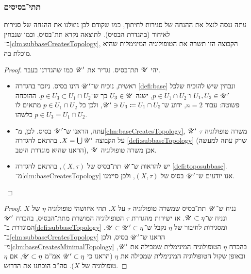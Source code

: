 \documentclass[name=רשימות טופולוגיה כללית]{../../../tex/classes/noChapterMegasumPreamble}
\begin{document}
	\subsubsection{\label{sss:subbases}תתי־בסיסים}

	עתה ננסה לנצל את ההנחה של סגירות לחיתוך, כמו שקודם לכן ניצלנו את ההנחה של סגירות לאיחוד (בהגדרת הבסיס). לתוצאה נקרא תת־בסיס, וכמו שנבחין ב־\ref{clm:subbaseCreatesTopology}, הקבוצה הזו תשרה את הטופולוגיה המינימלית שהיא מוכלת בה. 
	\begin{proof}
		יהי $\mathscr{U}$ תת־בסיס. נגדיר את $\mathscr{U}'$ כמו שהגדרנו בעבר. 
		\begin{itemize}
			\item ראשית, נוכיח ש־$\mathscr{U}'$ הינו בסיס. ניזכר בהגדרה \ref{defi:base} ונבחין שיש להוכיח שלכל $U_1, U_2 \in \mathscr{U}'$ ו־$p \in U_1 \cap U_2$, ישנה $U_3 \in \mathscr{U}$ כך ש־$p \in U_3 \subset U_1 \cap U_2$. ההוכחה פשוטה: עבור $n = 2$, ידוע ש־$\mathscr{U}' \ni U_3 \coloneqq U_1 \cap U_2$, ולכן כל $p \in U_1 \cap U_2$ מתאים לו $p \in U_3 = U_1 \cap U_2$ כלשהו. 
			\item עתה, הראנו ש־$\mathscr{U}'$ בסיס. לכן, מ־\ref{clm:baseCreatesTopology}, $\mathscr{U}'$ משרה טופולוגיה $\tau$ על הקבוצה $X = \bigcup \mathscr{U}'$. בהתאם להגדרה \ref{defi:subbaseTopology} (שרק עתה למעשה הראנו שהיא מוגדרת היטב), $\mathscr{U}$ אכן משרה טופולוגיה. 
			\item יש להראות ש־$\mathscr{U}$ תת־בסיס של $(X, \tau)$, בהתאם להגדרה \ref{defi:toposubbase}. מ־\ref{clm:baseCreatesTopology} אנו יודעים ש־$\mathscr{U}'$ בסיס של $(X, \tau)$, ולכן סיימנו. 
		\end{itemize}\envendproof
	\end{proof}
	\begin{proof}
		נניח ש־$\mathscr{U}$ תת־בסיס שמשרה טופולוגיה $\tau$ על $X$. תהי איזושהי טופולוגיה $\eta$ של $X$ ונניח ש־$\mathscr{U} \subset \eta$. אז ישירות מהגדרת $\tau$ הטופולוגיה המושרת מתת־הבסיס, בהכרח $\mathscr{U}'$ המוגדרת ב־\ref{defi:subbaseTopology} ומסגירות לחיבור של $\eta$ נקבל ש־$\mathscr{U} \subset \mathscr{U}' \subset \eta$. ב־\ref{clm:subbaseCreatesTopology} הראנו ש־$\mathscr{U}'$ בסיס, ולכן מ־\ref{clm:baseCreatesMinimalTopology} בהכרח $\eta$ הטופולוגיה המינימלית שמכילה את $\mathscr{U}'$, ובאופן שקול הטופולוגיה המינימלית שמכילה את $\eta$ (הראנו כי $\mathscr{U}' \subset \eta$ אמ''מ $\mathscr{U} \subset \eta$, אם $\eta$ טופולוגיה של $X$). סה''כ הוכחנו את הדרוש. 
	\end{proof}
\end{document}

